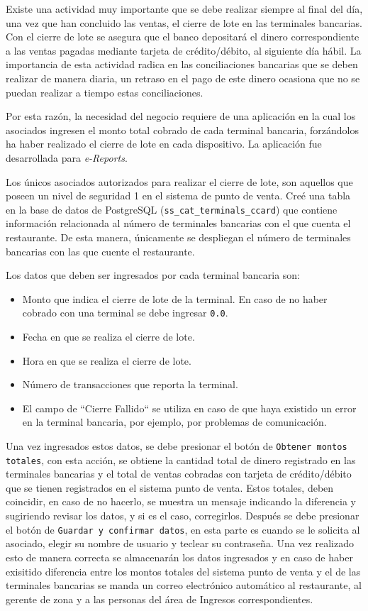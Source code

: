 Existe una actividad muy importante que se debe realizar siempre al final del día, una vez que han concluido las ventas, el cierre de lote en las terminales bancarias. Con el cierre de lote se asegura que el banco depositará el dinero correspondiente a las ventas pagadas mediante tarjeta de crédito/débito, al siguiente día hábil. La importancia de esta actividad radica en las conciliaciones bancarias que se deben realizar de manera diaria, un retraso en el pago de este dinero ocasiona que no se puedan realizar a tiempo estas conciliaciones.

Por esta razón, la necesidad del negocio requiere de una aplicación en la cual los asociados ingresen el monto total cobrado de cada terminal bancaria, forzándolos ha haber realizado el cierre de lote en cada dispositivo. La aplicación fue desarrollada para \textit{e-Reports}.

Los únicos asociados autorizados para realizar el cierre de lote, son aquellos que poseen un nivel de seguridad 1 en el sistema de punto de venta. Creé una tabla en la base de datos de PostgreSQL (\texttt{ss\_cat\_terminals\_ccard}) que contiene información relacionada al número de terminales bancarias con el que cuenta el restaurante. De esta manera, únicamente se despliegan el número de terminales bancarias con las que cuente el restaurante.

Los datos que deben ser ingresados por cada terminal bancaria son:

\begin{itemize}
 \item Monto que indica el cierre de lote de la terminal. En caso de no haber cobrado con una terminal se debe ingresar \texttt{0.0}.
 \item Fecha en que se realiza el cierre de lote.
 \item Hora en que se realiza el cierre de lote.
 \item Número de transacciones que reporta la terminal.
 \item El campo de ``Cierre Fallido`` se utiliza en caso de que haya existido un error en la terminal bancaria, por ejemplo, por problemas de comunicación.
\end{itemize}

Una vez ingresados estos datos, se debe presionar el botón de \texttt{Obtener montos totales}, con esta acción, se obtiene la cantidad total de dinero registrado en las terminales bancarias y el total de ventas cobradas con tarjeta de crédito/débito que se tienen registrados en el sistema punto de venta. Estos totales, deben coincidir, en caso de no hacerlo, se muestra un mensaje indicando la diferencia y sugiriendo revisar los datos, y si es el caso, corregirlos. Después se debe presionar el botón de \texttt{Guardar y confirmar datos}, en esta parte es cuando se le solicita al asociado, elegir su nombre de usuario y teclear su contraseña. Una vez realizado esto de manera correcta se almacenarán los datos ingresados y en caso de haber exisitido diferencia entre los montos totales del sistema punto de venta y el de las terminales bancarias se manda un correo electrónico automático al restaurante, al gerente de zona y a las personas del área de Ingresos correspondientes.


